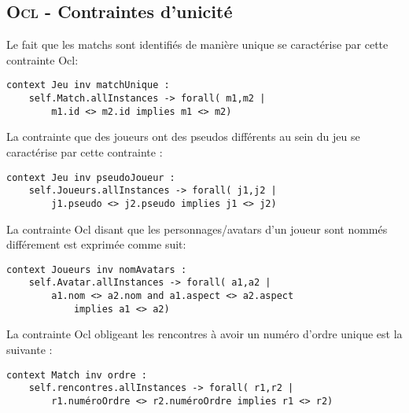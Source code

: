 
\subsection{\textsc{Ocl} - Contraintes d'unicité}
\label{sec:question3}

Le fait que les matchs sont identifiés de manière unique se caractérise par cette contrainte Ocl:

\begin{lstlisting}[caption=Contrainte sur l'unicité d'un match,captionpos=b,label={lst:match},language=OCL]
context Jeu inv matchUnique :
    self.Match.allInstances -> forall( m1,m2 |
        m1.id <> m2.id implies m1 <> m2)
\end{lstlisting}

La contrainte que des joueurs ont des pseudos différents au sein du jeu se caractérise par cette contrainte :

\begin{lstlisting}[caption=Contrainte sur les pseudos,captionpos=b,label={lst:pseudos},language=OCL]
context Jeu inv pseudoJoueur :
    self.Joueurs.allInstances -> forall( j1,j2 |
        j1.pseudo <> j2.pseudo implies j1 <> j2)
\end{lstlisting}

La contrainte Ocl disant que les personnages/avatars d'un joueur sont nommés différement est exprimée comme suit:

\begin{lstlisting}[caption=Contrainte sur le nom,captionpos=b,label={lst:nomAvatar},language=OCL]
context Joueurs inv nomAvatars :
    self.Avatar.allInstances -> forall( a1,a2 |
        a1.nom <> a2.nom and a1.aspect <> a2.aspect
            implies a1 <> a2)
\end{lstlisting}

La contrainte Ocl obligeant les rencontres à avoir un numéro d'ordre unique est la suivante :

\begin{lstlisting}[caption=Contrainte sur le numéro d'ordre unique,captionpos=b,label={lst:numUnique},language=OCL]
context Match inv ordre :
    self.rencontres.allInstances -> forall( r1,r2 |
        r1.numéroOrdre <> r2.numéroOrdre implies r1 <> r2)
\end{lstlisting}